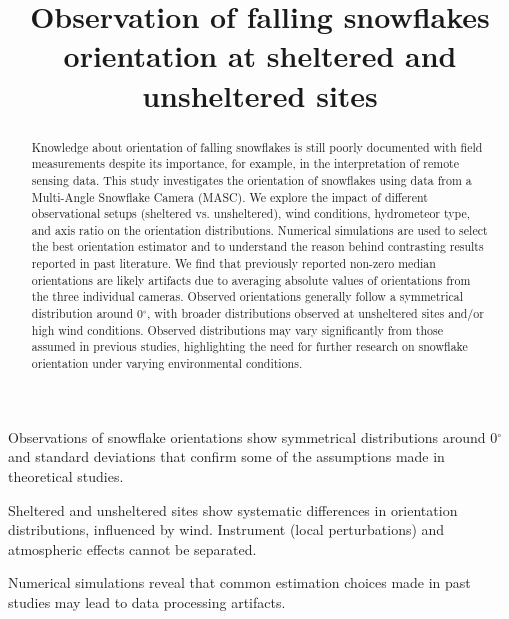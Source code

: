 \documentclass[draft]{agujournal2019}
\begin{document}
\title{Observation of falling snowflakes orientation at sheltered and unsheltered sites}






\begin{keypoints}
\item Observations of snowflake orientations show symmetrical distributions around 0$^\circ$ and standard deviations that confirm some of the assumptions made in theoretical studies. 
\item Sheltered and unsheltered sites show systematic differences in orientation distributions, influenced by wind. Instrument (local perturbations) and atmospheric effects cannot be separated.
\item Numerical simulations reveal that common estimation choices made in past studies may lead to data processing artifacts.
\end{keypoints}



\begin{abstract}
Knowledge about orientation of falling snowflakes is still poorly documented with field measurements despite its importance, for example, in the interpretation of remote sensing data. This study investigates the orientation of  snowflakes using data from a Multi-Angle Snowflake Camera (MASC). We explore the impact of different observational setups (sheltered vs. unsheltered), wind conditions, hydrometeor type, and axis ratio on the orientation distributions. Numerical simulations are used to select the best orientation estimator and to understand the reason behind contrasting results reported in past literature. We find that previously reported non-zero median orientations are likely artifacts due to averaging absolute values of orientations from the three individual cameras. Observed orientations generally follow a symmetrical distribution around 0$^\circ$, with broader distributions observed at unsheltered sites and/or high wind conditions.  Observed distributions may vary significantly from those assumed in previous studies, highlighting the need for further research on snowflake orientation under varying environmental conditions.
\end{abstract}
\end{document}
